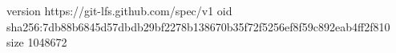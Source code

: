 version https://git-lfs.github.com/spec/v1
oid sha256:7db88b6845d57dbdb29bf2278b138670b35f72f5256ef8f59c892eab4ff2f810
size 1048672
